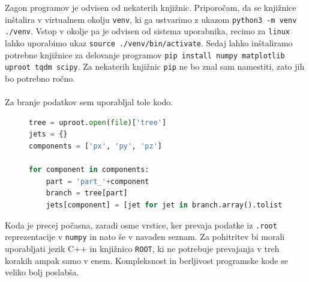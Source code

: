 \\
\\
\newpage \noindent
Zagon programov je odvisen od nekaterih knjižnic. Priporočam, da se knjižnice
inštalira v virtualnem okolju \verb|venv|, ki ga ustvarimo z ukazom \verb|python3 -m venv ./venv|.
Vstop v okolje pa je odvisen od sistema uporabnika, recimo za \verb|linux| lahko uporabimo
ukaz \verb|source ./venv/bin/activate|. Sedaj lahko inštaliramo potrebne knjižnice
za delovanje programov \verb|pip install numpy matplotlib uproot tqdm scipy|. Za nekaterih knjižnic
\verb|pip| ne bo znal sam namestiti, zato jih bo potrebno ročno.
\\
\\
Za branje podatkov sem uporabljal tole kodo.
\begin{figure}[h]
\begin{lstlisting}[language=Python]
tree = uproot.open(file)['tree']
jets = {}
components = ['px', 'py', 'pz']

for component in components:
    part = 'part_'+component
    branch = tree[part]
    jets[component] = [jet for jet in branch.array().tolist()]

\end{lstlisting}
\end{figure}
Koda je precej počasna, zaradi osme vrstice, ker prevaja podatke iz \verb|.root|
reprezentacije v \verb|numpy| in nato še v navaden seznam. Za pohitritev bi morali
uporabljati jezik C++ in knjižnico \verb|ROOT|, ki ne potrebuje prevajanja v treh korakih ampak samo v enem.
Kompleksnost in berljivost programske kode se veliko bolj poslabša. 

